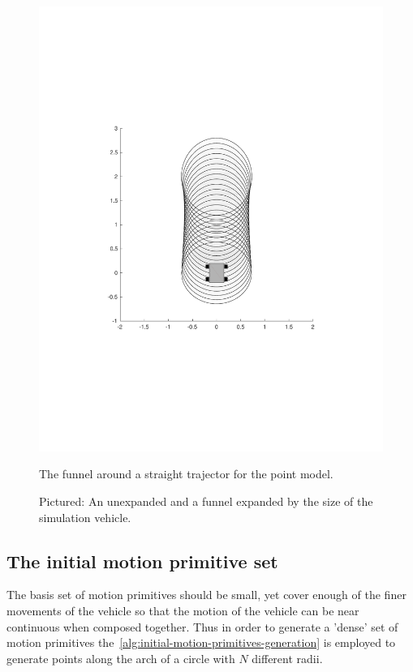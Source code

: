 \begin{figure}
\begin{minipage}{0.4\textwidth}
    \includegraphics[scale=.3]{figures/method/expanded-funnel-with-car}
    \caption{The funnel around a straight trajector for the point model.}
  \end{minipage}
  \caption{Pictured: An unexpanded and a funnel expanded by the size of the
    simulation vehicle.}
  \label{fig:expanded-and-unexpanded}
\end{figure}

\subsection{The initial motion primitive set}

The basis set of motion primitives should be small, yet cover enough of the
finer movements of the vehicle so that the motion of the vehicle can be near
continuous when composed together. Thus in order to generate a 'dense' set of
motion primitives the~\cref{alg:initial-motion-primitives-generation} is
employed to generate points along the arch of a circle with \(N\) different
radii.

